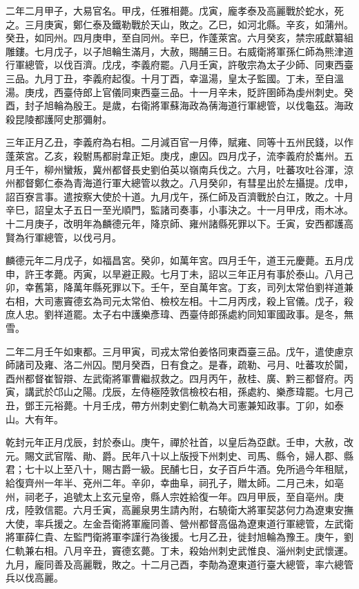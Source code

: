 \begin{pinyinscope}
 二年二月甲子，大易官名。甲戌，任雅相薨。戊寅，龐孝泰及高麗戰於蛇水，死之。三月庚寅，鄭仁泰及鐵勒戰於天山，敗之。乙巳，如河北縣。辛亥，如蒲州。癸丑，如同州。四月庚申，至自同州。辛巳，作蓬萊宮。六月癸亥，禁宗戚獻纂組雕鏤。七月戊子，以子旭輪生滿月，大赦，賜酺三日。右威衛將軍孫仁師為熊津道行軍總管，以伐百濟。戊戌，李義府罷。八月壬寅，許敬宗為太子少師、同東西臺三品。九月丁丑，李義府起復。十月丁酉，幸溫湯，皇太子監國。丁未，至自溫湯。庚戌，西臺侍郎上官儀同東西臺三品。十一月辛未，貶許圉師為虔州刺史。癸酉，封子旭輪為殷王。是歲，右衛將軍蘇海政為蒨海道行軍總管，以伐龜茲。海政殺昆陵都護阿史那彌射。



 三年正月乙丑，李義府為右相。二月減百官一月俸，賦雍、同等十五州民錢，以作蓬萊宮。乙亥，殺駙馬都尉韋正矩。庚戌，慮囚。四月戊子，流李義府於巂州。五月壬午，柳州蠻叛，冀州都督長史劉伯英以嶺南兵伐之。六月，吐蕃攻吐谷渾，涼州都督鄭仁泰為青海道行軍大總管以救之。八月癸卯，有彗星出於左攝提。戊申，詔百寮言事。遣按察大使於十道。九月戊午，孫仁師及百濟戰於白江，敗之。十月辛巳，詔皇太子五日一至光順門，監諸司奏事，小事決之。十一月甲戌，雨木冰。十二月庚子，改明年為麟德元年，降京師、雍州諸縣死罪以下。壬寅，安西都護高賢為行軍總管，以伐弓月。



 麟德元年二月戊子，如福昌宮。癸卯，如萬年宮。四月壬午，道王元慶薨。五月戊申，許王孝薨。丙寅，以旱避正殿。七月丁未，詔以三年正月有事於泰山。八月己卯，幸舊第，降萬年縣死罪以下。壬午，至自萬年宮。丁亥，司列太常伯劉祥道兼右相，大司憲竇德玄為司元太常伯、檢校左相。十二月丙戌，殺上官儀。戊子，殺庶人忠。劉祥道罷。太子右中護樂彥瑋、西臺侍郎孫處約同知軍國政事。是冬，無雪。



 二年二月壬午如東都。三月甲寅，司戎太常伯姜恪同東酉臺三品。戊午，遣使慮京師諸司及雍、洛二州囚。閏月癸酉，日有食之。是春，疏勒、弓月、吐蕃攻於闐，酉州都督崔智辯、左武衛將軍曹繼叔救之。四月丙午，赦桂、廣、黔三都督府。丙寅，講武於邙山之陽。戊辰，左侍極陸敦信檢校右相，孫處約、樂彥瑋罷。七月己丑，鄧王元裕薨。十月壬戌，帶方州刺史劉仁軌為大司憲兼知政事。丁卯，如泰山。大有年。



 乾封元年正月戊辰，封於泰山。庚午，禪於社首，以皇后為亞獻。壬申，大赦，改元。賜文武官階、勛、爵。民年八十以上版授下州刺史、司馬、縣令，婦人郡、縣君；七十以上至八十，賜古爵一級。民酺七日，女子百戶牛酒。免所過今年租賦，給復齊州一年半、兗州二年。辛卯，幸曲阜，祠孔子，贈太師。二月己未，如亳州，祠老子，追號太上玄元皇帝，縣人宗姓給復一年。四月甲辰，至自亳州。庚戌，陸敦信罷。六月壬寅，高麗泉男生請內附，右驍衛大將軍契苾何力為遼東安撫大使，率兵援之。左金吾衛將軍龐同善、營州都督高偘為遼東道行軍總管，左武衛將軍薛仁貴、左監門衛將軍李謹行為後援。七月乙丑，徙封旭輪為豫王。庚午，劉仁軌兼右相。八月辛丑，竇德玄薨。丁未，殺始州刺史武惟良、淄州刺史武懷運。九月，龐同善及高麗戰，敗之。十二月己酉，李勣為遼東道行臺大總管，率六總管兵以伐高麗。




\end{pinyinscope}
